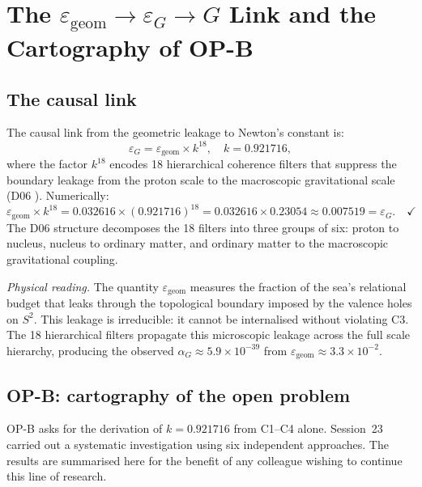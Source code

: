 \documentclass[12pt,a4paper]{article}
\theoremstyle{plain}
\theoremstyle{definition}
\theoremstyle{remark}
\newenvironment{epsbox}[1][]{%
  \begin{tcolorbox}[epsstyle,title={Key Result\ifx\relax#1\relax\else: #1\fi}]}{\end{tcolorbox}}
\newcommand{\egeom}{\varepsilon_{\mathrm{geom}}}
\newcommand{\eG}{\varepsilon_G}
\begin{document}
\section{The \texorpdfstring{$\egeom\to\eG\to G$}{ε\_geom → ε\_G → G} Link and the Cartography of OP-B}
\label{sec:link}

\subsection{The causal link}

\begin{epsbox}[$\egeom\to\eG\to G$ --- Sessions~21--23]
\label{box:link}
The causal link from the geometric leakage to Newton's constant is:
\[
\eG = \egeom\times k^{18},\quad k = 0.921716,
\]
where the factor $k^{18}$ encodes 18 hierarchical coherence filters that suppress the boundary leakage from the proton scale to the macroscopic gravitational scale (D06 \citep{D06}). Numerically:
\[
\egeom\times k^{18} = 0.032616\times (0.921716)^{18} = 0.032616\times 0.23054 \approx 0.007519 = \eG.\quad\checkmark
\]
The D06 structure decomposes the 18 filters into three groups of six: proton to nucleus, nucleus to ordinary matter, and ordinary matter to the macroscopic gravitational coupling.
\end{epsbox}

\noindent\textit{Physical reading.} The quantity $\egeom$ measures the fraction of the sea's relational budget that leaks through the topological boundary imposed by the valence holes on $S^2$. This leakage is irreducible: it cannot be internalised without violating C3. The 18 hierarchical filters propagate this microscopic leakage across the full scale hierarchy, producing the observed $\alpha_G\approx 5.9\times 10^{-39}$ from $\egeom\approx 3.3\times 10^{-2}$.

\subsection{OP-B: cartography of the open problem}
\label{sec:opB}

OP-B asks for the derivation of $k=0.921716$ from C1--C4 alone. Session~23 carried out a systematic investigation using six independent approaches. The results are summarised here for the benefit of any colleague wishing to continue this line of research.
\end{document}
